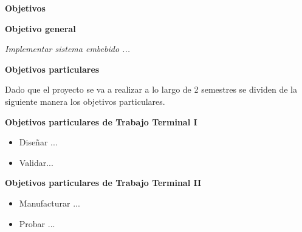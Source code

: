
\textbf{{\Huge Objetivos}}


\textbf{{\LARGE Objetivo general}}

\label{Objetivo general}

\begin{center}
	\textit{Implementar sistema embebido ...}
\end{center}

\textbf{{\LARGE Objetivos particulares}}

\label{Objetivos part}
Dado que el proyecto se va a realizar a lo largo de 2 semestres se dividen de la siguiente manera los objetivos particulares.

\textbf{{\large Objetivos particulares de Trabajo Terminal I}}

\begin{itemize}
	\item Diseñar ...
	\item Validar...
\end{itemize}

\textbf{{\large Objetivos particulares de Trabajo Terminal II}}
\begin{itemize}
	\item Manufacturar ...
	\item Probar ...
\end{itemize}
\newpage

